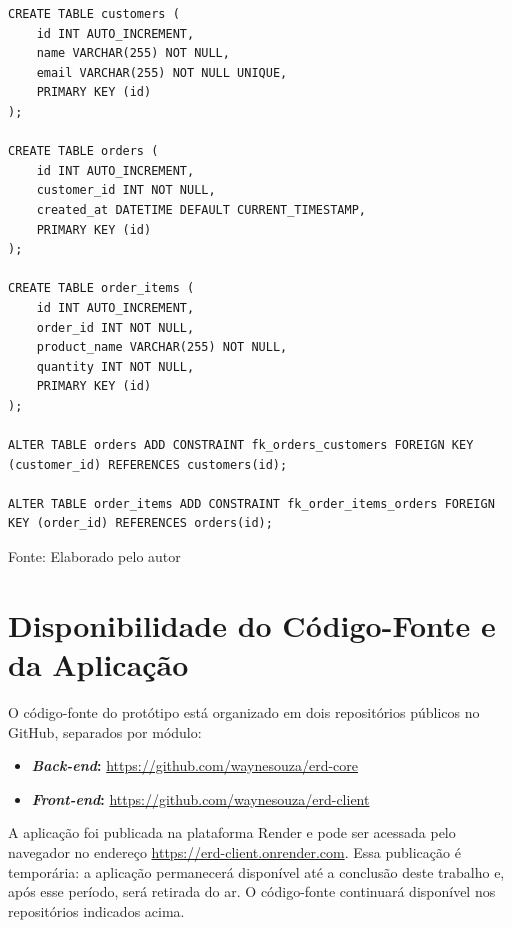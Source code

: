 \begin{quadro}[H]
    \begin{lstlisting}[frame=single, framesep=5pt, xleftmargin=5pt, xrightmargin=5pt]
CREATE TABLE customers (
    id INT AUTO_INCREMENT,
    name VARCHAR(255) NOT NULL,
    email VARCHAR(255) NOT NULL UNIQUE,
    PRIMARY KEY (id)
);

CREATE TABLE orders (
    id INT AUTO_INCREMENT,
    customer_id INT NOT NULL,
    created_at DATETIME DEFAULT CURRENT_TIMESTAMP,
    PRIMARY KEY (id)
);

CREATE TABLE order_items (
    id INT AUTO_INCREMENT,
    order_id INT NOT NULL,
    product_name VARCHAR(255) NOT NULL,
    quantity INT NOT NULL,
    PRIMARY KEY (id)
);

ALTER TABLE orders ADD CONSTRAINT fk_orders_customers FOREIGN KEY (customer_id) REFERENCES customers(id);

ALTER TABLE order_items ADD CONSTRAINT fk_order_items_orders FOREIGN KEY (order_id) REFERENCES orders(id);
    \end{lstlisting}
    \caption{\textit{Script} SQL gerado pela exportação do diagrama}
    \begin{center}
        {\small Fonte: Elaborado pelo autor}
    \end{center}
    \label{lst:ddl-exportado}
\end{quadro}

\section{Disponibilidade do Código-Fonte e da Aplicação}

O código-fonte do protótipo está organizado em dois repositórios públicos no GitHub, separados por módulo:

\begin{itemize}
    \item \textbf{\textit{Back-end}:} \url{https://github.com/waynesouza/erd-core}
    \item \textbf{\textit{Front-end}:} \url{https://github.com/waynesouza/erd-client}
\end{itemize}

A aplicação foi publicada na plataforma Render e pode ser acessada pelo navegador no endereço \url{https://erd-client.onrender.com}. Essa publicação é temporária: a aplicação permanecerá disponível até a conclusão deste trabalho e, após esse período, será retirada do ar. O código-fonte continuará disponível nos repositórios indicados acima.

